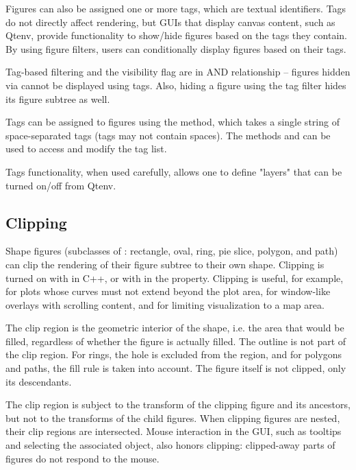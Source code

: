 Figures can also be assigned one or more tags, which are textual identifiers.
Tags do not directly affect rendering, but GUIs that display canvas content,
such as Qtenv, provide functionality to show/hide figures based on the tags they
contain. By using figure filters, users can conditionally display figures based
on their tags.

Tag-based filtering and the visibility flag are in AND relationship -- figures hidden
via  cannot be displayed using tags. Also, hiding a figure
using the tag filter hides its figure subtree as well.

Tags can be assigned to figures using the 
method, which takes a single string of space-separated tags (tags may not
contain spaces). The methods  and  can
be used to access and modify the tag list.

Tags functionality, when used carefully, allows one to define "layers"
that can be turned on/off from Qtenv.



\subsection{Clipping}
\label{sec:graphics:clipping}

Shape figures (subclasses of : rectangle, oval,
ring, pie slice, polygon, and path) can clip the rendering of their figure
subtree to their own shape. Clipping is turned on with
 in C++, or with  in the
 property. Clipping is useful, for example, for plots whose
curves must not extend beyond the plot area, for window-like overlays with
scrolling content, and for limiting visualization to a map area.

The clip region is the geometric interior of the shape, i.e. the area that would
be filled, regardless of whether the figure is actually filled. The outline is
not part of the clip region. For rings, the hole is excluded from the region,
and for polygons and paths, the fill rule is taken into account. The figure
itself is not clipped, only its descendants.

The clip region is subject to the transform of the clipping figure and its
ancestors, but not to the transforms of the child figures. When clipping
figures are nested, their clip regions are intersected. Mouse interaction in
the GUI, such as tooltips and selecting the associated object, also honors
clipping: clipped-away parts of figures do not respond to the mouse.

